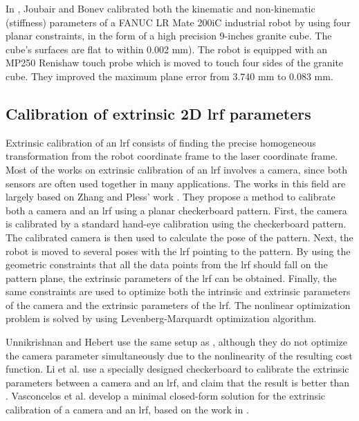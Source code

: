 In \cite{Joubair2015}, Joubair and Bonev calibrated both the kinematic and non-kinematic (stiffness) parameters of a FANUC LR Mate 200iC industrial robot by using four planar constraints, in the form of a high precision 9-inches granite cube. The cube's surfaces are flat to within 0.002 mm). The robot is equipped with an MP250 Renishaw touch probe which is moved to touch four sides of the granite cube. They improved the maximum plane error from 3.740 mm to 0.083 mm. 

\subsection{Calibration of extrinsic 2D \ac{lrf} parameters}
\label{sec:laser_calib}
Extrinsic calibration of an \ac{lrf} consists of finding the precise homogeneous transformation from the robot coordinate frame to the laser coordinate frame. Most of the works on extrinsic calibration of an \ac{lrf} involves a camera, since both sensors are often used together in many applications. The works in this field are largely based on Zhang and Pless' work \cite{Zhang2004}. They propose a method to calibrate both a camera and an \ac{lrf} using a planar checkerboard pattern. First, the camera is calibrated by a standard hand-eye calibration  \cite{BouguetJ.Y.2003} using the checkerboard pattern. The calibrated camera is then used to calculate the pose of the pattern. Next, the robot is moved to several poses with the \ac{lrf} pointing to the pattern. By using the geometric constraints that all the data points from the \ac{lrf} should fall on the pattern plane, the extrinsic parameters of the \ac{lrf} can be obtained. Finally, the same constraints are used to optimize both the intrinsic and extrinsic parameters of the camera and the extrinsic parameters of the \ac{lrf}. The nonlinear optimization problem is solved by using Levenberg-Marquardt optimization algorithm.

Unnikrishnan and Hebert \cite{Unnikrishnan2005} use the same setup as \cite{Zhang2004}, although they do not optimize the camera parameter simultaneously due to the nonlinearity of the resulting cost function. 
Li et al. \cite{Li2007} use a specially designed checkerboard to calibrate the extrinsic parameters between a camera and an \ac{lrf}, and claim that the result is better than \cite{Zhang2004}. Vasconcelos et al. \cite{Vasconcelos2012} develop a minimal closed-form solution for the extrinsic calibration of a camera and an \ac{lrf}, based on the work in \cite{Zhang2004}. 

